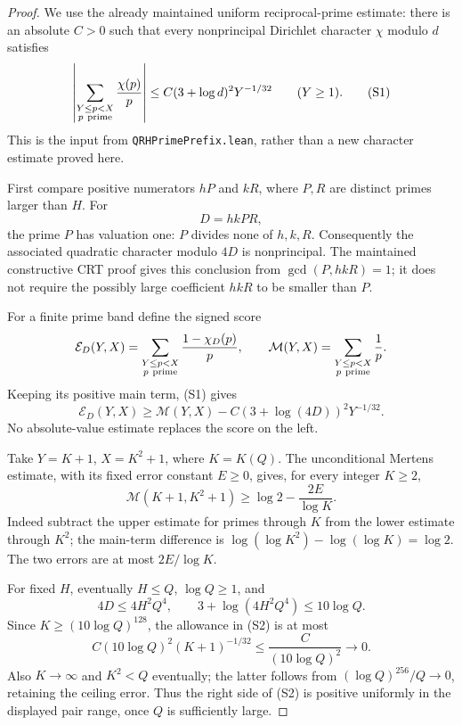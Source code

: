 \documentclass[11pt]{article}
\begin{document}
\begin{proof}
We use the already maintained uniform reciprocal-prime estimate:
there is an absolute \(C>0\) such that every nonprincipal Dirichlet
character \(\chi\) modulo \(d\) satisfies
\[
 \left|\sum_{\substack{Y\le p<X\\p\ {\rm prime}}}
                \frac{\chi(p)}p\right|
 \le C(3+\log d)^2Y^{-1/32}\qquad(Y\ge1).
 \tag{S1}\label{eq:signature-character-input}
\]
This is the input from \texttt{QRHPrimePrefix.lean}, rather than a
new character estimate proved here.

First compare positive numerators \(hP\) and \(kR\), where \(P,R\)
are distinct primes larger than \(H\).  For
\[
 D=hkPR,
\]
the prime \(P\) has valuation one: \(P\) divides none of \(h,k,R\).
Consequently the associated quadratic character modulo \(4D\)
is nonprincipal.  The maintained constructive CRT proof gives this
conclusion from \(\gcd(P,hkR)=1\); it does not require the possibly
large coefficient \(hkR\) to be smaller than \(P\).

For a finite prime band define the signed score
\[
 {\mathcal E}_D(Y,X)=
 \sum_{\substack{Y\le p<X\\p\ {\rm prime}}}
       \frac{1-\chi_D(p)}p,\qquad
 {\mathcal M}(Y,X)=
 \sum_{\substack{Y\le p<X\\p\ {\rm prime}}}\frac1p.
\]
Keeping its positive main term, (S1) gives
\[
 {\mathcal E}_D(Y,X)\ge
 {\mathcal M}(Y,X)-C(3+\log(4D))^2Y^{-1/32}.
 \tag{S2}\label{eq:signature-signed-score}
\]
No absolute-value estimate replaces the score on the left.

Take \(Y=K+1\), \(X=K^2+1\), where \(K=K(Q)\).
The unconditional Mertens estimate, with its fixed error constant
\(E\ge0\), gives, for every integer \(K\ge2\),
\[
 {\mathcal M}(K+1,K^2+1)
 \ge \log2-\frac{2E}{\log K}.
 \tag{S3}\label{eq:signature-band-mass}
\]
Indeed subtract the upper estimate for primes through \(K\) from
the lower estimate through \(K^2\); the main-term difference is
\(\log(\log K^2)-\log(\log K)=\log2\).
The two errors are at most \(2E/\log K\).

For fixed \(H\), eventually \(H\le Q\), \(\log Q\ge1\), and
\[
 4D\le4H^2Q^4,\qquad
 3+\log(4H^2Q^4)\le10\log Q.
\]
Since \(K\ge(10\log Q)^{128}\), the allowance in (S2) is at most
\[
 C(10\log Q)^2(K+1)^{-1/32}
 \le \frac{C}{(10\log Q)^2}\longrightarrow0.
\]
Also \(K\to\infty\) and \(K^2<Q\) eventually; the latter follows
from \((\log Q)^{256}/Q\to0\), retaining the ceiling error.
Thus the right side of (S2) is positive uniformly in the displayed
pair range, once \(Q\) is sufficiently large.


\end{proof}
\end{document}
